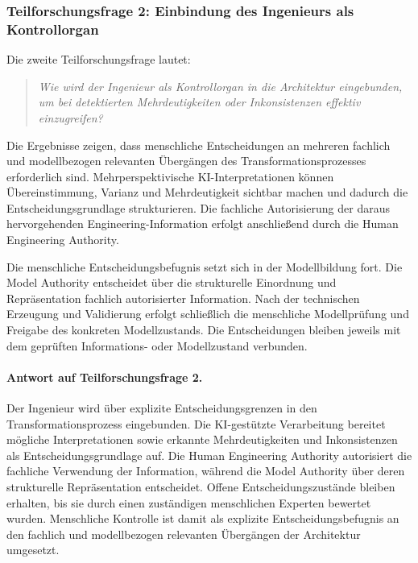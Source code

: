 \subsubsection[Teilforschungsfrage 2: Ingenieur als Kontrollorgan]
{Teilforschungsfrage 2: Einbindung des Ingenieurs als Kontrollorgan}
\label{sec:discussion_rq2}

Die zweite Teilforschungsfrage lautet:

\begin{quote}
\textit{Wie wird der Ingenieur als Kontrollorgan in die Architektur
eingebunden, um bei detektierten Mehrdeutigkeiten oder Inkonsistenzen
effektiv einzugreifen?}
\end{quote}

Die Ergebnisse zeigen, dass menschliche Entscheidungen an mehreren
fachlich und modellbezogen relevanten Übergängen des Transformationsprozesses
erforderlich sind. Mehrperspektivische KI-Interpretationen können
Übereinstimmung, Varianz und Mehrdeutigkeit sichtbar machen und dadurch die
Entscheidungsgrundlage strukturieren. Die fachliche Autorisierung der daraus
hervorgehenden Engineering-Information erfolgt anschließend durch die Human
Engineering Authority.

Die menschliche Entscheidungsbefugnis setzt sich in der Modellbildung fort.
Die Model Authority entscheidet über die strukturelle Einordnung und
Repräsentation fachlich autorisierter Information. Nach der technischen
Erzeugung und Validierung erfolgt schließlich die menschliche Modellprüfung
und Freigabe des konkreten Modellzustands. Die Entscheidungen bleiben jeweils
mit dem geprüften Informations- oder Modellzustand verbunden.

\paragraph{Antwort auf Teilforschungsfrage 2.}

Der Ingenieur wird über explizite Entscheidungsgrenzen in den
Transformationsprozess eingebunden. Die KI-gestützte Verarbeitung bereitet
mögliche Interpretationen sowie erkannte Mehrdeutigkeiten und
Inkonsistenzen als Entscheidungsgrundlage auf. Die Human Engineering
Authority autorisiert die fachliche Verwendung der Information, während die
Model Authority über deren strukturelle Repräsentation entscheidet. Offene
Entscheidungszustände bleiben erhalten, bis sie durch einen zuständigen
menschlichen Experten bewertet wurden. Menschliche Kontrolle ist damit als
explizite Entscheidungsbefugnis an den fachlich und modellbezogen relevanten
Übergängen der Architektur umgesetzt.


